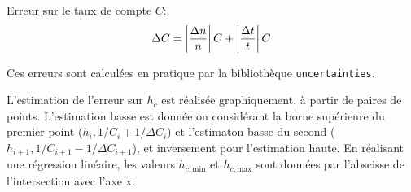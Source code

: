 Erreur sur le taux de compte \(C\):
\begin{equation}
    \Delta C = \left|\frac{\Delta n}{n}\right| C + \left|\frac{\Delta t}{t}\right| C
\end{equation}

Ces erreurs sont calculées en pratique par la bibliothèque \texttt{uncertainties}.

L'estimation de l'erreur sur \(h_c\) est réalisée graphiquement, à partir de paires de points. L'estimation basse est donnée on considérant la borne supérieure du premier point (\(h_i, 1/C_i + 1/\Delta C_i\)) et l'estimaton basse du second (\(h_{i+1}, 1/C_{i+1} - 1/\Delta C_{i+1}\)), et inversement pour l'estimation haute. En réalisant une régression linéaire, les valeurs \(h_{c,\textrm{min}}\) et \(h_{c,\textrm{max}}\) sont données par l'abscisse de l'intersection avec l'axe x.


